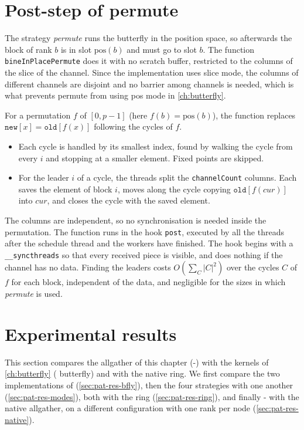 \section{Post-step of permute}\label{sec:pat-permute}

The strategy \emph{permute} runs the butterfly in the position space, so afterwards the block of rank $b$ is in slot $\mathrm{pos}(b)$ and must go to slot $b$.
The function \texttt{bineInPlacePermute} does it with no scratch buffer, restricted to the columns of the slice of the channel.
Since the implementation uses slice mode, the columns of different channels are disjoint and no barrier among channels is needed, which is what prevents permute from using pos mode in \cref{ch:butterfly}.

For a permutation $f$ of $[0,p-1]$ (here $f(b)=\mathrm{pos}(b)$), the function replaces $\texttt{new}[x]=\texttt{old}[f(x)]$ following the cycles of $f$.
\begin{itemize}
  \item Each cycle is handled by its smallest index, found by walking the cycle from every $i$ and stopping at a smaller element. Fixed points are skipped.
  \item For the leader $i$ of a cycle, the threads split the \texttt{channelCount} columns. Each saves the element of block $i$, moves along the cycle copying $\texttt{old}[f(\mathit{cur})]$ into $\mathit{cur}$, and closes the cycle with the saved element.
\end{itemize}
The columns are independent, so no synchronisation is needed inside the permutation.
The function runs in the hook \texttt{post}, executed by all the threads after the schedule thread and the workers have finished. The hook begins with a \texttt{\_\_syncthreads} so that every received piece is visible, and does nothing if the channel has no data.
Finding the leaders costs $O(\sum_C \lvert C\rvert^2)$ over the cycles $C$ of $f$ for each block, independent of the data, and negligible for the sizes in which \emph{permute} is used.

\section{Experimental results}\label{sec:pat-exp}

This section compares the allgather of this chapter (\bine{}-\pat{}) with the kernels of \cref{ch:butterfly} (\bine{} butterfly) and with the native \nccl{} ring.
We first compare the two implementations of \bine{} (\cref{sec:pat-res-bfly}), then the four strategies with one another (\cref{sec:pat-res-modes}), both with the ring (\cref{sec:pat-res-ring}), and finally \bine{}-\pat{} with the native \pat{} allgather, on a different configuration with one rank per node (\cref{sec:pat-res-native}).

